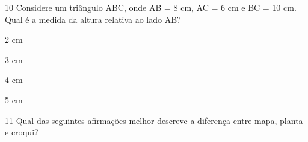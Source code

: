 
\num{10} Considere um triângulo ABC, onde AB = 8 cm, AC = 6 cm e BC = 10 cm.
Qual é a medida da altura relativa ao lado AB?

\begin{escolha}
\item 2 cm
\item 3 cm
\item 4 cm
\item 5 cm
\end{escolha}





\num{11} Qual das seguintes afirmações melhor descreve a diferença entre
mapa, planta e croqui?

